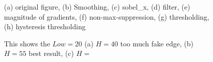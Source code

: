 \documentclass[final]{cvpr}
\begin{document}
\begin{appendices}
\begin{figure}[h]
{  }
  \quad
  \quad
  \caption{(a) original figure, (b) Smoothing, (c) sobel\_x, (d) filter, (e) magnitude of gradients, (f) non-max-suppression, (g) thresholding, (h) hysteresis thresholding}
  \label{fig:cannyall}
  \end{figure}
  
  

  \begin{figure}[hbp]
    \centering
    \quad
    \quad
    \caption{This shows the $Low=20$ (a) $H=40$ too much fake edge, (b) $H=55$ best result, (c) $H=$}
    \label{fig: Cannycompare}
    \end{figure}



\end{appendices}
\end{document}
